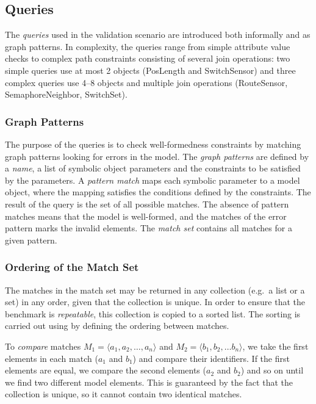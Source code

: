 \documentclass[submission,copyright,creativecommons]{eptcs}
\begin{document}
\subsection{Queries}
\label{queries}

The \emph{queries} used in the validation scenario are introduced both informally and as graph patterns. In complexity, the queries range from simple attribute value checks to complex path constraints consisting of several join operations: two simple queries use at most 2 objects (\textsf{PosLength} and \textsf{SwitchSensor}) and three complex queries use 4--8 objects and multiple join operations (\textsf{RouteSensor}, \textsf{SemaphoreNeighbor}, \textsf{SwitchSet}). 

\subsubsection{Graph Patterns}

The purpose of the queries is to check well-formedness constraints by matching graph patterns looking for errors in the model. The \emph{graph patterns} are defined by a \emph{name}, a list of symbolic object parameters and the constraints to be satisfied by the parameters. A \emph{pattern match} maps each symbolic parameter to a model object, where the mapping satisfies the conditions defined by the constraints. The result of the query is the set of all possible matches. The absence of pattern matches means that the model is well-formed, and the matches of the error pattern marks the invalid elements. The \emph{match set} contains all matches for a given pattern.

\subsubsection{Ordering of the Match Set}
\label{ordering}

The matches in the match set may be returned in any collection (e.g.\ a list or a set) in any order, given that the collection is unique. In order to ensure that the benchmark is \emph{repeatable}, this collection is copied to a sorted list. The sorting is carried out using by defining the ordering between matches.

To \emph{compare} matches $M_1 = \langle a_1, a_2, \ldots, a_n \rangle$ and $M_2 = \langle b_1, b_2, \ldots b_n \rangle$, we take the first elements in each match ($a_1$ and $b_1$) and compare their identifiers. If the first elements are equal, we compare the second elements ($a_2$ and $b_2$) and so on until we find two different model elements. This is guaranteed by the fact that the collection is unique, so it cannot contain two identical matches.
\end{document}
